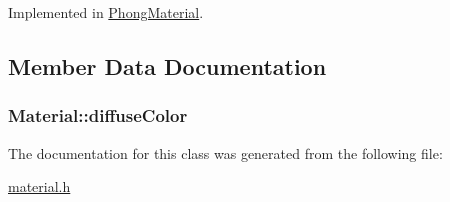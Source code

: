 Implemented in \hyperlink{classPhongMaterial_aa35744f32b0505bd60e4295e0ba87b28}{Phong\+Material}.



\subsection{Member Data Documentation}
\hypertarget{classMaterial_ae81bccaee22b88d46074b843dc7bdc32}{
\subsubsection[{diffuse\+Color}]{ Material\+::diffuse\+Color\hspace{0.3cm}{\ttfamily [protected]}}}\label{classMaterial_ae81bccaee22b88d46074b843dc7bdc32}


The documentation for this class was generated from the following file\+:\begin{DoxyCompactItemize}
\item 
\hyperlink{material_8h}{material.\+h}\end{DoxyCompactItemize}
